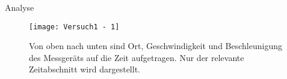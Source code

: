 \documentclass{alex_gp}
\begin{document}
\newpage
\begin{mybox}{Analyse}
	\begin{figure}[H]
		\vspace{-0.5cm}		
		\texttt{[image: Versuch1 - 1]}
		\caption{Von oben nach unten sind Ort, Geschwindigkeit und Beschleunigung des Messgeräts auf die Zeit aufgetragen. Nur der relevante Zeitabschnitt wird dargestellt.}
	\end{figure}
\end{mybox}
\end{document}
